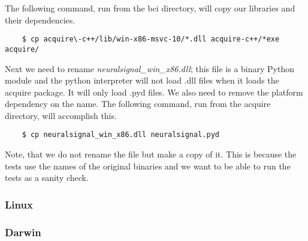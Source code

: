 \documentclass[11pt]{article}
\begin{document}
The following command, run from the bci directory, will copy our libraries and their dependencies.

\begin{verbatim}
    $ cp acquire\-c++/lib/win-x86-msvc-10/*.dll acquire-c++/*exe acquire/
\end{verbatim}

Next we need to rename \textit{neuralsignal\_win\_x86.dll}; this file is a binary Python module and the python interpreter will not load .dll files when it loads the acquire package.  It will only load .pyd files.  We also need to remove the platform dependency on the name.  The following command, run from the acquire directory, will accomplish this.

\begin{verbatim}
    $ cp neuralsignal_win_x86.dll neuralsignal.pyd
\end{verbatim}

Note, that we do not rename the file but make a copy of it.  This is because the tests use the names of the original binaries and we want to be able to run the tests as a sanity check.

\subsubsection{Linux}
\subsubsection{Darwin}
\end{document}
